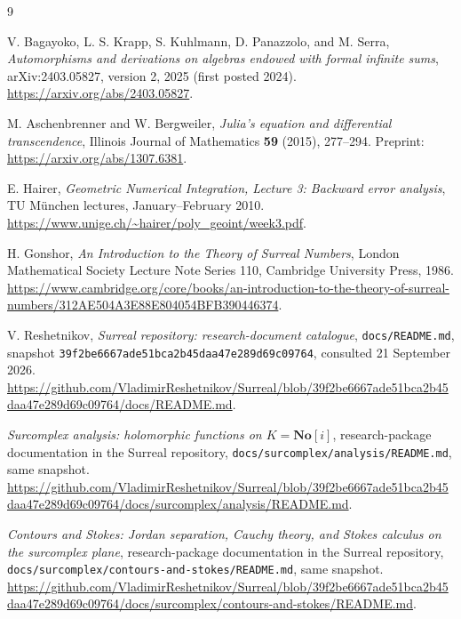\documentclass[11pt,a4paper]{article}
\numberwithin{equation}{section}
\theoremstyle{definition}
\theoremstyle{remark}
\newcommand{\No}{\mathbf{No}}
\begin{document}
\clearpage
{}
{}
\begingroup
\small\raggedright
\begin{thebibliography}{9}

V. Bagayoko, L. S. Krapp, S. Kuhlmann, D. Panazzolo, and M. Serra,
\emph{Automorphisms and derivations on algebras endowed with formal infinite
sums}, arXiv:2403.05827, version 2, 2025 (first posted 2024).
\url{https://arxiv.org/abs/2403.05827}.

M. Aschenbrenner and W. Bergweiler,
\emph{Julia's equation and differential transcendence},
Illinois Journal of Mathematics \textbf{59} (2015), 277--294.
Preprint: \url{https://arxiv.org/abs/1307.6381}.

E. Hairer, \emph{Geometric Numerical Integration, Lecture 3: Backward error
analysis}, TU M\"unchen lectures, January--February 2010.
\url{https://www.unige.ch/~hairer/poly_geoint/week3.pdf}.

H. Gonshor, \emph{An Introduction to the Theory of Surreal Numbers},
London Mathematical Society Lecture Note Series 110,
Cambridge University Press, 1986.
\url{https://www.cambridge.org/core/books/an-introduction-to-the-theory-of-surreal-numbers/312AE504A3E88E804054BFB390446374}.

V. Reshetnikov, \emph{Surreal repository: research-document catalogue},
\texttt{docs/README.md}, snapshot
\texttt{39f2be6667ade51bca2b45daa47e289d69c09764}, consulted 21 September 2026.
\url{https://github.com/VladimirReshetnikov/Surreal/blob/39f2be6667ade51bca2b45daa47e289d69c09764/docs/README.md}.

\emph{Surcomplex analysis: holomorphic functions on $K=\No[i]$},
research-package documentation in the Surreal repository,
\texttt{docs/surcomplex/analysis/README.md}, same snapshot.
\url{https://github.com/VladimirReshetnikov/Surreal/blob/39f2be6667ade51bca2b45daa47e289d69c09764/docs/surcomplex/analysis/README.md}.

\emph{Contours and Stokes: Jordan separation, Cauchy theory, and Stokes
calculus on the surcomplex plane}, research-package documentation in the
Surreal repository, \texttt{docs/surcomplex/contours-and-stokes/README.md},
same snapshot.
\url{https://github.com/VladimirReshetnikov/Surreal/blob/39f2be6667ade51bca2b45daa47e289d69c09764/docs/surcomplex/contours-and-stokes/README.md}.

\end{thebibliography}
\endgroup
\end{document}
